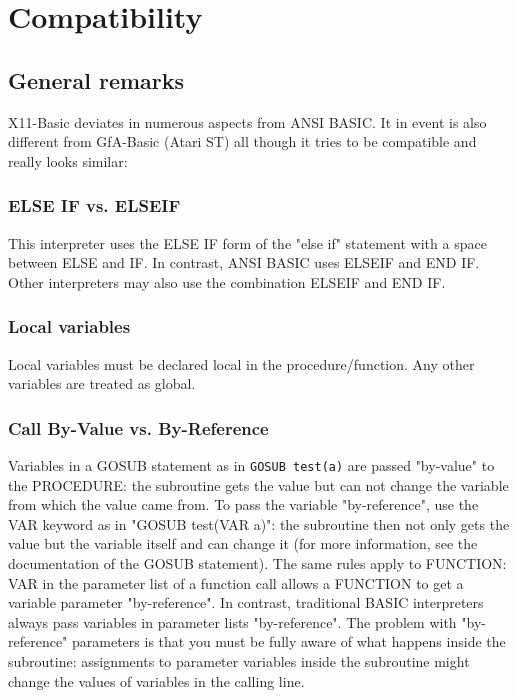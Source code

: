 
\chapter{Compatibility}
\label{compat}
\section{General remarks}

X11-Basic deviates in numerous aspects from ANSI BASIC. It in event is also
different from GfA-Basic (Atari ST) all though it tries to be compatible and
really looks similar:

\subsection*{ELSE IF vs. ELSEIF}

This interpreter uses the ELSE IF form of the "else if" statement with a space 
between ELSE and IF. In contrast, ANSI BASIC uses ELSEIF and END IF. Other
interpreters may also use the combination ELSEIF and END IF.


\subsection*{Local variables}

Local variables must be declared local in the procedure/function. Any other
variables are treated as global.

\subsection*{Call By-Value vs. By-Reference}

Variables in a GOSUB statement as in \verb|GOSUB test(a)| are passed "by-value" to the
PROCEDURE: the subroutine gets the value but can not change the variable from which the value
came from. To pass the variable "by-reference", use the VAR keyword as in "GOSUB test(VAR 
a)": the subroutine then not only gets the value but the variable itself and can change it
(for more information, see the documentation of the GOSUB  statement). The same rules apply
to FUNCTION: VAR in the parameter list of a function call allows a FUNCTION to get a variable
parameter "by-reference". In contrast, traditional BASIC interpreters always pass variables
in  parameter lists "by-reference". The problem with "by-reference" parameters is that you
must be fully aware of what happens inside the subroutine: assignments to parameter variables
inside the subroutine might change the values of variables in the calling line.


